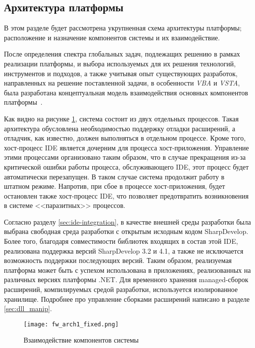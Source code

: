 \subsection{Архитектура платформы}
\label{sec:fw_arch}

В этом разделе будет рассмотрена укрупненная схема архитектуры платформы; расположение и назначение компонентов системы и их взаимодействие.

После определения спектра глобальных задач, подлежащих решению в рамках реализации платформы, и выбора используемых для их решения технологий, инструментов и подходов, а также учитывая опыт существующих разработок, направленных на решение поставленной задачи, в особенности {\it VBA} и {\it VSTA}, была разработана концептуальная модель взаимодействия основных компонентов платформы~\cite{patterns-of-enterprise-app}.

Как видно на рисунке \ref{fw_arch1}, система состоит из двух отдельных процессов. Такая архитектура обусловлена необходимостью поддержку отладки расширений, а отладчик, как известно, должен выполняться в отдельном процессе. Кроме того, хост-процесс IDE является дочерним для процесса хост-приложения. Управление этими процессами организовано таким образом, что в случае прекращения из-за критической ошибки работы процесса, обслуживающего IDE, этот процесс будет автоматически перезапущен. В таком случае система продолжит работу в штатном режиме. Напротив, при сбое в процессе хост-приложения, будет остановлен также хост-процесс IDE, что позволяет предотвратить возникновения в системе <<паразитных>> процессов.

Согласно разделу \ref{sec:ide-integration}, в качестве внешней среды разработки была выбрана свободная среда разработки с открытым исходным кодом SharpDevelop. Более того, благодаря совместимости библиотек входящих в состав этой IDE, реализована поддержка версий SharpDevelop 3.2 и 4.1, а также не исключается возможность поддержки последующих версий. Таким образом, реализуемая платформа может быть с успехом использована в приложениях, реализованных на различных версиях платформы .NET. Для временного хранения managed-сборок расширений, компилируемых средой разработки, используется изолированное хранилище. Подробнее про управление сборками расширений написано в разделе \ref{sec:dll_manip}.

\begin{figure}[!h]
    \centering
    \texttt{[image: fw\_arch1\_fixed.png]}
    \caption{Взаимодействие компонентов системы}
    \label{fw_arch1}
\end{figure}

